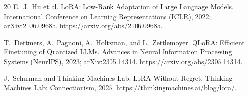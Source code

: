 \documentclass{article}
\begin{document}
\begin{thebibliography}{20}
E.~J.~Hu et al.
\newblock LoRA: Low-Rank Adaptation of Large Language Models.
\newblock International Conference on Learning Representations (ICLR), 2022; arXiv:2106.09685.
\newblock \url{https://arxiv.org/abs/2106.09685}.

T.~Dettmers, A.~Pagnoni, A.~Holtzman, and L.~Zettlemoyer.
\newblock QLoRA: Efficient Finetuning of Quantized LLMs.
\newblock Advances in Neural Information Processing Systems (NeurIPS), 2023; arXiv:2305.14314.
\newblock \url{https://arxiv.org/abs/2305.14314}.

J.~Schulman and Thinking Machines Lab.
\newblock LoRA Without Regret.
\newblock Thinking Machines Lab: Connectionism, 2025.
\newblock \url{https://thinkingmachines.ai/blog/lora/}.

\end{thebibliography}
\end{document}
